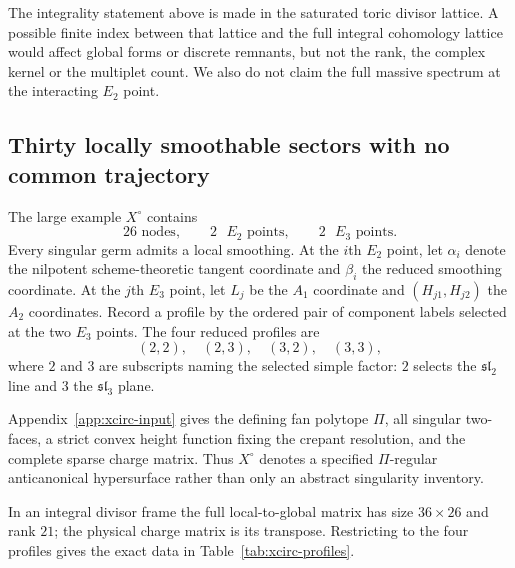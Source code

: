 The integrality statement above is made in the saturated toric divisor
lattice. A possible finite index between that lattice and the full integral
cohomology lattice would affect global forms or discrete remnants, but not the
rank, the complex kernel or the multiplet count. We also do not claim the full
massive spectrum at the interacting $E_2$ point.

\subsection{Thirty locally smoothable sectors with no common trajectory}
\label{subsec:xcirc}

The large example $X^{\circ}$ contains
\begin{equation}
 26\text{ nodes},
 \qquad 2\text{ }E_2\text{ points},
 \qquad 2\text{ }E_3\text{ points}.
 \label{eq:xcirc-content}
\end{equation}
Every singular germ admits a local smoothing. At the $i$th $E_2$ point, let
$\alpha_i$ denote the nilpotent scheme-theoretic tangent coordinate and
$\beta_i$ the reduced smoothing coordinate. At the
$j$th $E_3$ point, let $L_j$ be the $A_1$ coordinate and
$(H_{j1},H_{j2})$ the $A_2$ coordinates. Record a profile by the ordered pair
of component labels selected at the two $E_3$ points. The four reduced
profiles are
\begin{equation}
 (2,2),\quad (2,3),\quad (3,2),\quad (3,3),
 \label{eq:xcirc-profiles}
\end{equation}
where $2$ and $3$ are subscripts naming the selected simple factor:
$2$ selects the $\mathfrak{sl}_2$ line and $3$ the $\mathfrak{sl}_3$ plane.

Appendix~\ref{app:xcirc-input} gives the defining fan polytope $\Pi$, all singular
two-faces, a strict convex height function fixing the crepant resolution, and
the complete sparse charge matrix. Thus $X^{\circ}$ denotes a specified
$\Pi$-regular anticanonical hypersurface rather than only an abstract
singularity inventory.

In an integral divisor frame the full local-to-global matrix has size
$36\times26$ and rank $21$; the physical charge matrix is its transpose.
Restricting to the four profiles gives the exact data in
Table~\ref{tab:xcirc-profiles}.

